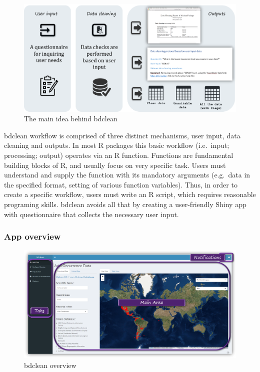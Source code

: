 \documentclass[]{book}
\begin{document}
\begin{figure}
\centering
\includegraphics{img/bdclean_overview.png}
\caption{The main idea behind bdclean}
\end{figure}

bdclean workflow is comprised of three distinct mechanisms, user input,
data cleaning and outputs. In most R packages this basic workflow
(i.e.~input; processing; output) operates via an R function. Functions
are fundamental building blocks of R, and usually focus on very specific
task. Users must understand and supply the function with its mandatory
arguments (e.g.~data in the specified format, setting of various
function variables). Thus, in order to create a specific workflow, users
must write an R script, which requires reasonable programing skills.
bdclean avoids all that by creating a user-friendly Shiny app with
questionnaire that collects the necessary user input.

\subsubsection*{App overview}\label{app-overview}

\begin{figure}
\centering
\includegraphics{img/bdclean_app_overview.png}
\caption{bdclean overview}
\end{figure}
\end{document}
